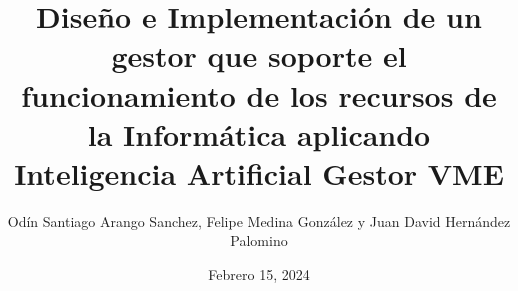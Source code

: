 \documentclass{beamer}
\title{
    Diseño e Implementación de un gestor que soporte el funcionamiento de los
    recursos de la Informática aplicando Inteligencia Artificial \break Gestor
    VME
}
\institute{Universidad Central}
\date{Febrero 15, 2024}
\author{Odín Santiago Arango Sanchez,
Felipe Medina González y
Juan David Hernández Palomino}
\begin{document}
\begin{frame}
	\titlepage
\end{frame}





\end{document}
